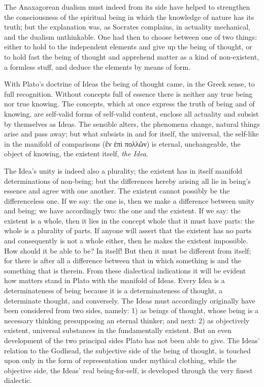 \documentclass[12pt,a4paper]{book}
\begin{document}
The Anaxagorean dualism must indeed from its side have helped to strengthen the consciousness of the
spiritual being in which the knowledge of nature has its truth; but the explanation was, as Socrates complains, in
actuality mechanical, and the dualism unthinkable. One had then to choose between one of two things: either to hold
to the independent elements and give up the being of thought, or to hold fast the being of thought and apprehend
matter as a kind of non-existent, a formless stuff, and deduce the elements by means of form.

With Plato's doctrine of Ideas the being of thought came, in the Greek sense, to full recognition. Without concepts
full of essence there is neither any true being nor true knowing. The concepts, which at once express the truth of
being and of knowing, are self-valid forms of self-valid content, enclose all actuality and subsist by themselves
as Ideas. The sensible alters, the phenomena change, natural things arise and pass away; but what subsists in and
for itself, the universal, the self-like in the manifold of comparisons
(ἓν ἐπὶ πολλῶν) is eternal, unchangeable, the object of knowing, the existent itself, \emph{the Idea}.

The Idea's unity is indeed also a plurality; the existent has in itself manifold determinations of non-being; but
the differences hereby arising all lie in being's essence and agree with one another. The existent cannot possibly
be the differenceless one. If we say: the one is, then we make a difference between unity and being; we have
accordingly two: the one and the existent. If we say: the existent is a whole, then it lies in the concept whole
that it must have parts: the whole is a plurality of parts. If anyone will assert that the existent has no parts
and consequently is not a whole either, then he makes the existent impossible. How should it be able to be? In
itself! But then it must be different from itself; for there is after all a difference between that in which
something is and the something that is therein. From these dialectical indications it will be evident how matters
stand in Plato with the manifold of Ideas. Every Idea is a determinateness of being because it is a determinateness
of thought, a determinate thought, and conversely. The Ideas must accordingly originally have been considered from
two sides, namely: 1) as beings of thought, whose being is a necessary thinking presupposing an eternal thinker; and
next: 2) as objectively existent, universal substances in the fundamentally existent. But an even development of the
two principal sides Plato has not been able to give. The Ideas' relation to the Godhead, the subjective side of the
being of thought, is touched upon only in the form of representation under mythical clothing, while the objective
side, the Ideas' real being-for-self, is developed through the very finest dialectic.
\end{document}
